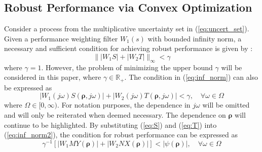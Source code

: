 \documentclass[letterpaper, 10 pt, conference]{ieeeconf}  %
\begin{document}
\subsection{Robust Performance via Convex Optimization}
Consider a process from the multiplicative uncertainty set in (\ref{eq:uncert_set}). Given a performance weighting filter $W_1(s)$ with bounded infinity norm, a necessary and sufficient condition for achieving robust performance is given by \cite{DFT92}:
\begin{equation}\label{eq:inf_norm}
\| |W_1 S| + |W_2 T| \|_{\infty} < \gamma
\end{equation}
where $\gamma = 1$. However, the problem of minimizing the upper bound $\gamma$ will be considered in this paper, where $ \gamma \in \mathbb{R}_+$. The condition in (\ref{eq:inf_norm}) can also be expressed as
\begin{equation} \label{eq:inf_norm2}
|W_1(j\omega)S(\bm{\rho},j\omega)|+|W_2(j\omega)T(\bm{\rho},j\omega)|<\gamma, \quad \forall \omega \in \Omega
\end{equation}
where $\Omega \in [0,\infty)$. For notation purposes, the dependence in $j\omega$ will be omitted and will only be reiterated when deemed necessary. The dependence on $\bm{\rho}$ will continue to be highlighted. By substituting (\ref{eq:S}) and (\ref{eq:T}) into (\ref{eq:inf_norm2}), the condition for robust performance can be expressed as
\begin{equation} \label{eq:circle}
\gamma^{-1}\left[ |W_1MY(\bm{\rho})| + |W_2 NX(\bm{\rho})| \right] < |\psi(\bm{\rho})|, \quad \forall \omega \in \Omega
\end{equation}
\end{document}

